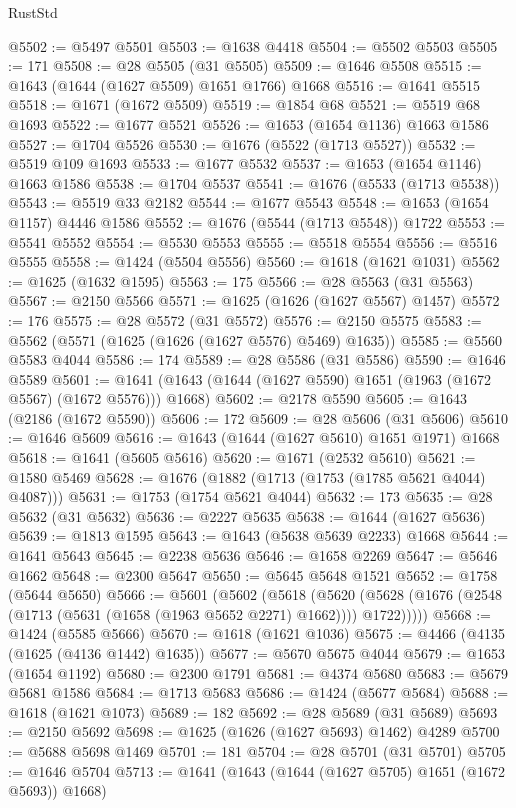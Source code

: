 \begin{lexlean}{RustStd}
\begin{coremodule}
@5502 := @5497 @5501
@5503 := @1638 @4418
@5504 := @5502 @5503
@5505 := 171
@5508 := @28 @5505 (@31 @5505)
@5509 := @1646 @5508
@5515 := @1643 (@1644 (@1627 @5509) @1651 @1766) @1668
@5516 := @1641 @5515
@5518 := @1671 (@1672 @5509)
@5519 := @1854 @68
@5521 := @5519 @68 @1693
@5522 := @1677 @5521
@5526 := @1653 (@1654 @1136) @1663 @1586
@5527 := @1704 @5526
@5530 := @1676 (@5522 (@1713 @5527))
@5532 := @5519 @109 @1693
@5533 := @1677 @5532
@5537 := @1653 (@1654 @1146) @1663 @1586
@5538 := @1704 @5537
@5541 := @1676 (@5533 (@1713 @5538))
@5543 := @5519 @33 @2182
@5544 := @1677 @5543
@5548 := @1653 (@1654 @1157) @4446 @1586
@5552 := @1676 (@5544 (@1713 @5548)) @1722
@5553 := @5541 @5552
@5554 := @5530 @5553
@5555 := @5518 @5554
@5556 := @5516 @5555
@5558 := @1424 (@5504 @5556)
@5560 := @1618 (@1621 @1031)
@5562 := @1625 (@1632 @1595)
@5563 := 175
@5566 := @28 @5563 (@31 @5563)
@5567 := @2150 @5566
@5571 := @1625 (@1626 (@1627 @5567) @1457)
@5572 := 176
@5575 := @28 @5572 (@31 @5572)
@5576 := @2150 @5575
@5583 := @5562 (@5571 (@1625 (@1626 (@1627 @5576) @5469) @1635))
@5585 := @5560 @5583 @4044
@5586 := 174
@5589 := @28 @5586 (@31 @5586)
@5590 := @1646 @5589
@5601 := @1641 (@1643 (@1644 (@1627 @5590) @1651 (@1963 (@1672 @5567) (@1672 @5576))) @1668)
@5602 := @2178 @5590
@5605 := @1643 (@2186 (@1672 @5590))
@5606 := 172
@5609 := @28 @5606 (@31 @5606)
@5610 := @1646 @5609
@5616 := @1643 (@1644 (@1627 @5610) @1651 @1971) @1668
@5618 := @1641 (@5605 @5616)
@5620 := @1671 (@2532 @5610)
@5621 := @1580 @5469
@5628 := @1676 (@1882 (@1713 (@1753 (@1785 @5621 @4044) @4087)))
@5631 := @1753 (@1754 @5621 @4044)
@5632 := 173
@5635 := @28 @5632 (@31 @5632)
@5636 := @2227 @5635
@5638 := @1644 (@1627 @5636)
@5639 := @1813 @1595
@5643 := @1643 (@5638 @5639 @2233) @1668
@5644 := @1641 @5643
@5645 := @2238 @5636
@5646 := @1658 @2269
@5647 := @5646 @1662
@5648 := @2300 @5647
@5650 := @5645 @5648 @1521
@5652 := @1758 (@5644 @5650)
@5666 := @5601
    (@5602
      (@5618
        (@5620 (@5628 (@1676 (@2548 (@1713 (@5631 (@1658 (@1963 @5652 @2271) @1662)))) @1722)))))
@5668 := @1424 (@5585 @5666)
@5670 := @1618 (@1621 @1036)
@5675 := @4466 (@4135 (@1625 (@4136 @1442) @1635))
@5677 := @5670 @5675 @4044
@5679 := @1653 (@1654 @1192)
@5680 := @2300 @1791
@5681 := @4374 @5680
@5683 := @5679 @5681 @1586
@5684 := @1713 @5683
@5686 := @1424 (@5677 @5684)
@5688 := @1618 (@1621 @1073)
@5689 := 182
@5692 := @28 @5689 (@31 @5689)
@5693 := @2150 @5692
@5698 := @1625 (@1626 (@1627 @5693) @1462) @4289
@5700 := @5688 @5698 @1469
@5701 := 181
@5704 := @28 @5701 (@31 @5701)
@5705 := @1646 @5704
@5713 := @1641 (@1643 (@1644 (@1627 @5705) @1651 (@1672 @5693)) @1668)

\end{coremodule}
\end{lexlean}
